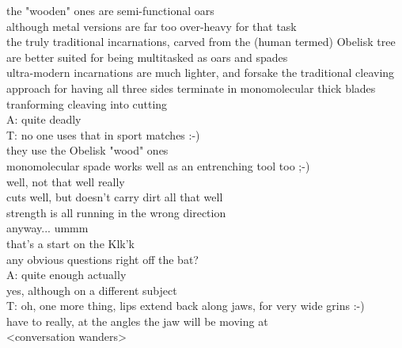 the "wooden" ones are semi-functional oars\\
although metal versions are far too over-heavy for that task\\
the truly traditional incarnations, carved from the (human termed) Obelisk tree\\
are better suited for being multitasked as oars and spades\\
ultra-modern incarnations are much lighter, and forsake the traditional cleaving approach for having all three sides terminate in monomolecular thick blades\\
tranforming cleaving into cutting\\
A: quite deadly\\
T: no one uses that in sport matches :-)\\
they use the Obelisk "wood" ones\\
monomolecular spade works well as an entrenching tool too ;-)\\
well, not that well really\\
cuts well, but doesn't carry dirt all that well\\
strength is all running in the wrong direction\\
anyway... ummm\\
that's a start on the Klk'k\\
any obvious questions right off the bat?\\
A: quite enough actually\\
yes, although on a different subject\\
T: oh, one more thing, lips extend back along jaws, for very wide grins :-)\\
have to really, at the angles the jaw will be moving at\\

<conversation wanders>\\

